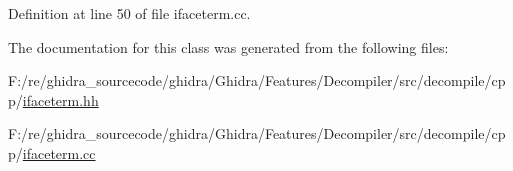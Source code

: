 Definition at line 50 of file ifaceterm.\+cc.



The documentation for this class was generated from the following files\+:\begin{DoxyCompactItemize}
\item 
F\+:/re/ghidra\+\_\+sourcecode/ghidra/\+Ghidra/\+Features/\+Decompiler/src/decompile/cpp/\mbox{\hyperlink{ifaceterm_8hh}{ifaceterm.\+hh}}\item 
F\+:/re/ghidra\+\_\+sourcecode/ghidra/\+Ghidra/\+Features/\+Decompiler/src/decompile/cpp/\mbox{\hyperlink{ifaceterm_8cc}{ifaceterm.\+cc}}\end{DoxyCompactItemize}

